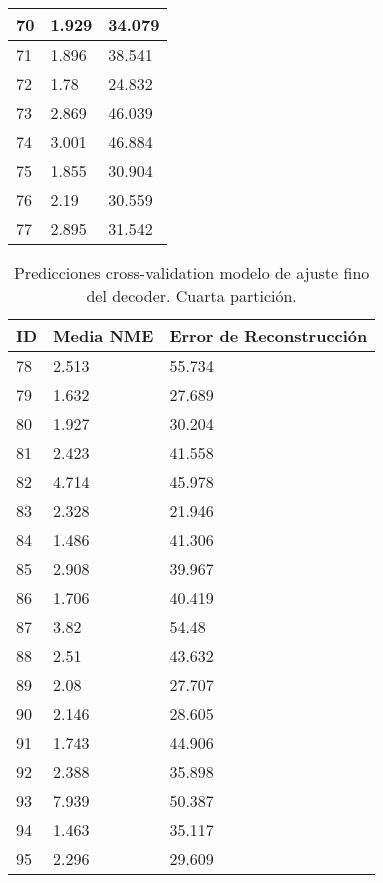 \begin{table}[!ht]
\begin{tabular}{|l|l|l|}
        70 & 1.929 & 34.079 \\ \hline
        71 & 1.896 & 38.541 \\ \hline
        72 & 1.78 & 24.832 \\ \hline
        73 & 2.869 & 46.039 \\ \hline
        74 & 3.001 & 46.884 \\ \hline
        75 & 1.855 & 30.904 \\ \hline
        76 & 2.19 & 30.559 \\ \hline
        77 & 2.895 & 31.542 \\ \hline
    \end{tabular}
\end{table}

\begin{table}[!ht]
    \centering
    \caption{Predicciones cross-validation modelo de ajuste fino del  decoder. Cuarta partición.}
    \begin{tabular}{|l|l|l|}
    \hline
    \cellcolor{gray!25}\textbf{ID} & \cellcolor{gray!25}\textbf{Media NME} & \cellcolor{gray!25}\textbf{Error de Reconstrucción} \\ \hline
        78 & 2.513 & 55.734 \\ \hline
        79 & 1.632 & 27.689 \\ \hline
        80 & 1.927 & 30.204 \\ \hline
        81 & 2.423 & 41.558 \\ \hline
        82 & 4.714 & 45.978 \\ \hline
        83 & 2.328 & 21.946 \\ \hline
        84 & 1.486 & 41.306 \\ \hline
        85 & 2.908 & 39.967 \\ \hline
        86 & 1.706 & 40.419 \\ \hline
        87 & 3.82 & 54.48 \\ \hline
        88 & 2.51 & 43.632 \\ \hline
        89 & 2.08 & 27.707 \\ \hline
        90 & 2.146 & 28.605 \\ \hline
        91 & 1.743 & 44.906 \\ \hline
        92 & 2.388 & 35.898 \\ \hline
        93 & 7.939 & 50.387 \\ \hline
        94 & 1.463 & 35.117 \\ \hline
        95 & 2.296 & 29.609 \\ \hline

\end{tabular}
\end{table}

